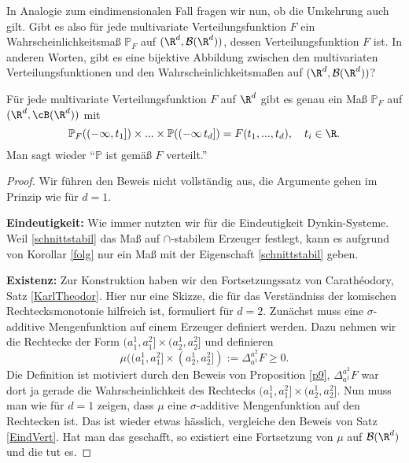\marginpar{\textcolor{red}{Vorlesung 20}}
In Analogie zum eindimensionalen Fall fragen wir nun, ob die Umkehrung auch gilt. Gibt es also f\"ur jede multivariate Verteilungsfunktion $F$ ein Wahrscheinlichkeitsma\ss{} $\mathbb P_F$ auf $(\R^d, \mathcal B(\R^d))$, dessen Verteilungsfunktion $F$ ist. In anderen Worten, gibt es eine bijektive Abbildung zwischen den multivariaten Verteilungsfunktionen und den Wahrscheinlichkeitsma\ss en auf $(\R^d, \mathcal B(\R^d))$?
\begin{satz}
	Für jede multivariate Verteilungsfunktion $F$ auf $\R^d$ gibt es genau ein Maß $\mathbb P_F$ auf $(\R^d,\cB(\R^d))$ mit 
	\begin{equation}\label{schnittstabil}
		\mathbb{P}_F((-\infty,t_1]) \times ... \times \mathbb{P}((-\infty\,t_d]) = F(t_1,...,t_d),\quad t_i\in\R.
	\end{equation} Man sagt wieder \enquote{$\mathbb{P}$ ist gemäß $F$ verteilt.}
\end{satz}

\begin{proof}
	Wir f\"uhren den Beweis nicht vollst\"andig aus, die Argumente gehen im Prinzip wie f\"ur $d=1$.\smallskip
	
	\textbf{Eindeutigkeit:} Wie immer nutzten wir f\"ur die Eindeutigkeit Dynkin-Systeme. Weil \eqref{schnittstabil} das Maß auf $\cap$-stabilem Erzeuger festlegt, kann es aufgrund von Korollar \ref{folg} nur ein Ma\ss{} mit der Eigenschaft \eqref{schnittstabil} geben.\smallskip
	
	\textbf{Existenz:} Zur Konstruktion haben wir den Fortsetzungssatz von Carath\'eodory, Satz \ref{KarlTheodor}. Hier nur eine Skizze, die f\"ur das Verst\"andniss der komischen Rechtecksmonotonie hilfreich ist, formuliert f\"ur $d=2$. Zun\"achst muss eine $\sigma$-additive Mengenfunktion auf einem Erzeuger definiert werden. Dazu nehmen wir die Rechtecke der Form $(a_1^1,a_1^2] \times (a_2^1, a_2^2]$ und definieren	
	$$\mu((a_1^1,a_1^2] \times (a_2^1, a_2^2]) :=\Delta_{a^1}^{a^2} F \geq 0.$$ 
	Die Definition ist motiviert durch den Beweis von Proposition \ref{p9}, $\Delta_{a^1}^{a^2} F$ war dort ja gerade die Wahrscheinlichkeit des Rechtecks $(a_1^1,a_1^2] \times (a_2^1, a_2^2]$. Nun muss man wie f\"ur $d=1$ zeigen, dass $\mu$ eine $\sigma$-additive Mengenfunktion auf den Rechtecken ist. Das ist wieder etwas h\"asslich, vergleiche den Beweis von Satz \ref{EindVert}. Hat man das geschafft, so existiert eine Fortsetzung von $\mu$ auf $\mathcal B(\R^d)$ und die tut es.
	\end{proof}

